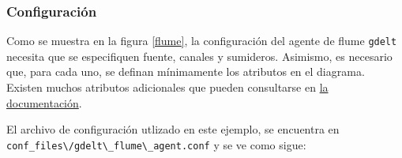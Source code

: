 \documentclass[]{article}
\begin{document}
\subsubsection{Configuración}\label{configuracion-1}

Como se muestra en la figura \ref{flume}, la configuración del agente de
flume \texttt{gdelt} necesita que se especifiquen fuente, canales y
sumideros. Asimismo, es necesario que, para cada uno, se definan
mínimamente los atributos en el diagrama. Existen muchos atributos
adicionales que pueden consultarse en
\href{https://flume.apache.org/FlumeUserGuide.html}{la documentación}.

El archivo de configuración utlizado en este ejemplo, se encuentra en
\texttt{conf\_files\textbackslash{}/gdelt\textbackslash{}\_flume\textbackslash{}\_agent.conf}
y se ve como sigue:
\end{document}

